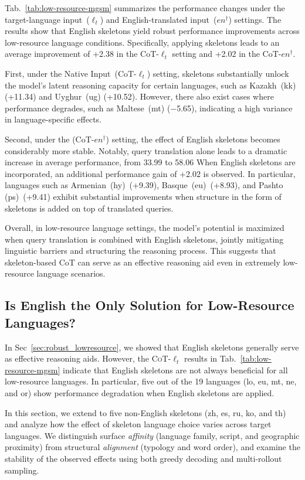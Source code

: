 Tab.~\ref{tab:low-resource-mgsm} summarizes the performance changes under the target-language input~($\ell_t$) and English-translated input~($en^{\dagger}$) settings. The results show that English skeletons yield robust performance improvements across low-resource language conditions. Specifically, applying skeletons leads to an average improvement of +2.38 in the CoT-$\ell_t$ setting and +2.02 in the CoT-$en^{\dagger}$.

First, under the Native Input~(CoT-$\ell_t$) setting, skeletons substantially unlock the model’s latent reasoning capacity for certain languages, such as Kazakh~(kk) (+11.34) and Uyghur~(ug) (+10.52). However, there also exist cases where performance degrades, such as Maltese~(mt) (−5.65), indicating a high variance in language-specific effects.

Second, under the (CoT-$en^{\dagger}$) setting, the effect of English skeletons becomes considerably more stable. Notably, query translation alone leads to a dramatic increase in average performance, from 33.99 to 58.06 When English skeletons are incorporated, an additional performance gain of +2.02 is observed. In particular, languages such as Armenian~(hy)~(+9.39), Basque~(eu)~(+8.93), and Pashto (ps)~(+9.41) exhibit substantial improvements when structure in the form of skeletons is added on top of translated queries.

Overall, in low-resource language settings, the model's potential is maximized when query translation is combined with English skeletons, jointly mitigating linguistic barriers and structuring the reasoning process. This suggests that skeleton-based CoT can serve as an effective reasoning aid even in extremely low-resource language scenarios.

\subsection{Is English the Only Solution for Low-Resource Languages?}
\label{sec:low-resource-nonen}
In Sec~\ref{sec:robust_lowresource}, we showed that English skeletons generally serve as effective reasoning aids. However, the \textsc{CoT-$\ell_t$} results in Tab.~\ref{tab:low-resource-mgsm} indicate that English skeletons are not always beneficial for all low-resource languages. In particular, five out of the 19 languages (lo, eu, mt, ne, and or) show performance degradation when English skeletons are applied.

In this section, we extend \LASEF to five non-English skeletons (zh, es, ru, ko, and th) and analyze how the effect of skeleton language choice varies across target languages. We distinguish surface \textit{affinity} (language family, script, and geographic proximity) from structural \textit{alignment} (typology and word order), and examine the stability of the observed effects using both greedy decoding and multi-rollout sampling.

